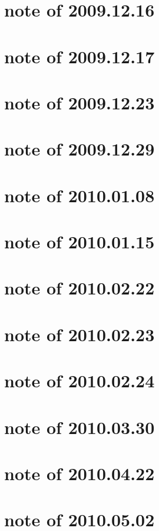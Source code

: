 \documentclass{article}
\begin{document}
\section{note of 2009.12.16}

\section{note of 2009.12.17}

\section{note of 2009.12.23}

\section{note of 2009.12.29}


\section{note of 2010.01.08}

\section{note of 2010.01.15}



\section{note of 2010.02.22}

\section{note of 2010.02.23}

\section{note of 2010.02.24}


\section{note of 2010.03.30}


\section{note of 2010.04.22}


\section{note of 2010.05.02}
%
\end{document}
